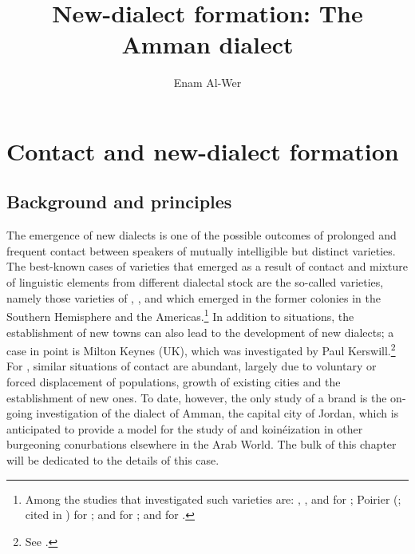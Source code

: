 \documentclass[output=paper]{langsci/langscibook}
\author{Enam Al-Wer\affiliation{University of Essex}}
\title{New-dialect formation: The Amman dialect}
\begin{document}
\maketitle 

\section{Contact and new-dialect formation} \label{new}


\subsection{Background and principles}

The emergence of new dialects is one of the possible outcomes of prolonged and frequent contact between speakers of mutually intelligible but distinct varieties. The best-known cases of varieties that emerged as a result of contact and mixture of linguistic elements from different dialectal stock are the so-called  varieties, namely those varieties of , ,  and  which emerged in the former colonies in the {Southern} Hemisphere and the Americas.\footnote{Among the studies that investigated such varieties are: \citet{Trudgill2004}, \citet{GordonEtAl2004}, \citet{Sudbury2000} and \citet{Schreier2003} for ; Poirier (\citeyear{Poirier1994}; cited in \citealt{Trudgill2004}) for ; \citet{Lipski1994} and \citet{Penny2000} for ; and \citet{Mattoso1972} for .} In addition to  situations, the establishment of new towns can also lead to the development of new dialects; a case in point is Milton Keynes (UK), which was investigated by Paul Kerswill.\footnote{See \citet{KerswillWilliams2005}.} For , similar situations of contact are abundant, largely due to voluntary or forced displacement of populations, growth of existing cities and the establishment of new ones. To date, however, the only study of a brand  is the on-going investigation of the dialect of Amman, the capital city of Jordan, which is anticipated to provide a model for the study of  and koinéization in other burgeoning conurbations elsewhere in the Arab World. The bulk of this chapter will be dedicated to the details of this case.
\end{document}
